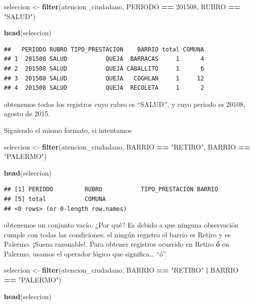 \documentclass[spanish,]{book}
\newenvironment{Shaded}{\begin{snugshade}}{\end{snugshade}}
\newcommand{\DecValTok}[1]{\textcolor[rgb]{0.00,0.00,0.81}{#1}}
\newcommand{\KeywordTok}[1]{\textcolor[rgb]{0.13,0.29,0.53}{\textbf{#1}}}
\newcommand{\NormalTok}[1]{#1}
\newcommand{\OperatorTok}[1]{\textcolor[rgb]{0.81,0.36,0.00}{\textbf{#1}}}
\newcommand{\StringTok}[1]{\textcolor[rgb]{0.31,0.60,0.02}{#1}}
\begin{document}
\begin{Shaded}
\begin{Highlighting}[]
\NormalTok{seleccion <-}\StringTok{ }\KeywordTok{filter}\NormalTok{(atencion_ciudadano, PERIODO }\OperatorTok{==}\StringTok{ }\DecValTok{201508}\NormalTok{,  RUBRO }\OperatorTok{==}\StringTok{ "SALUD"}\NormalTok{)}

\KeywordTok{head}\NormalTok{(seleccion)}
\end{Highlighting}
\end{Shaded}

\begin{verbatim}
##   PERIODO RUBRO TIPO_PRESTACION    BARRIO total COMUNA
## 1  201508 SALUD           QUEJA  BARRACAS     1      4
## 2  201508 SALUD           QUEJA CABALLITO     1      6
## 3  201508 SALUD           QUEJA   COGHLAN     1     12
## 4  201508 SALUD           QUEJA  RECOLETA     1      2
\end{verbatim}

obtenemos todos los registros cuyo rubro es ``SALUD'', y cuyo período es 20108, agosto de 2015.

Siguiendo el mismo formato, si intentamos

\begin{Shaded}
\begin{Highlighting}[]
\NormalTok{seleccion <-}\StringTok{ }\KeywordTok{filter}\NormalTok{(atencion_ciudadano, BARRIO }\OperatorTok{==}\StringTok{ "RETIRO"}\NormalTok{, BARRIO }\OperatorTok{==}\StringTok{ "PALERMO"}\NormalTok{)}

\KeywordTok{head}\NormalTok{(seleccion)}
\end{Highlighting}
\end{Shaded}

\begin{verbatim}
## [1] PERIODO         RUBRO           TIPO_PRESTACION BARRIO         
## [5] total           COMUNA         
## <0 rows> (or 0-length row.names)
\end{verbatim}

obtenemos un conjunto vacío. ¿Por qué? Es debido a que ninguna observación cumple con todas las condiciones; el ningún registro el barrio es Retiro y es Palermo. ¡Suena razonable!. Para obtener registros ocurrido en Retiro \textbf{ó} en Palermo, usamos el operador lógico \texttt{\textbar{}} que significa\ldots{} ``ó''.

\begin{Shaded}
\begin{Highlighting}[]
\NormalTok{seleccion <-}\StringTok{ }\KeywordTok{filter}\NormalTok{(atencion_ciudadano, BARRIO }\OperatorTok{==}\StringTok{ "RETIRO"} \OperatorTok{|}\StringTok{ }\NormalTok{BARRIO }\OperatorTok{==}\StringTok{ "PALERMO"}\NormalTok{)}

\KeywordTok{head}\NormalTok{(seleccion)}
\end{Highlighting}
\end{Shaded}
\end{document}
